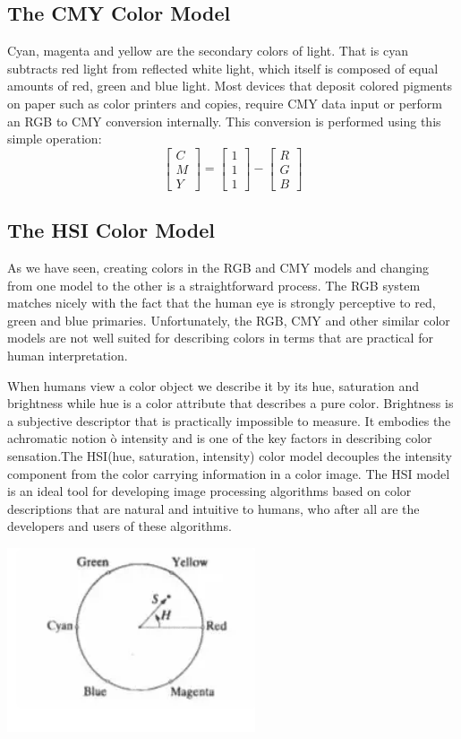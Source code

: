 \documentclass[a4paper,12pt]{article}
\begin{document}
\subsection{The CMY Color Model}
Cyan, magenta and yellow are the secondary colors of light. That is cyan
subtracts red light from reflected white light, which itself is composed of
equal amounts of red, green and blue light.  Most devices that deposit colored
pigments on paper such as color printers and copies, require CMY data input or
perform an RGB to CMY conversion internally. This conversion is performed using
this simple operation:
\[\begin{bmatrix}C\\M\\Y\end{bmatrix}
= \begin{bmatrix}1\\1\\1\end{bmatrix}
- \begin{bmatrix}R\\G\\B\end{bmatrix}\]

\subsection{The HSI Color Model}
As we have seen, creating colors in the RGB and CMY models and changing from
one model to the other is a straightforward process. The RGB system matches
nicely with the fact that the human eye is strongly perceptive to red, green
and blue primaries. Unfortunately, the RGB, CMY and other similar color models
are not well suited for describing colors in terms that are practical for human
interpretation.

When humans view a color object we describe it by its hue, saturation and
brightness while hue is a color attribute that describes a pure color.
Brightness is a subjective descriptor that is  practically impossible to
measure. It embodies the achromatic notion ò intensity and is one of the key
factors in describing color sensation.The HSI(hue, saturation, intensity) color
model decouples the intensity component from the color carrying information in
a color image. The HSI model is an ideal tool for developing image processing
algorithms based on color descriptions that are natural and intuitive to
humans, who after all are the developers and users of these algorithms.
\begin{center}
  \includegraphics[width=0.55\textwidth]{hsi.png}
\end{center}
\end{document}

